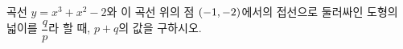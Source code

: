 곡선 $y=x^3+x^2-2$와 이 곡선 위의 점 $(-1{,}\mkern3mu\mathopen{}-2)$에서의 접선으로 둘러싸인 도형의 넓이를 $\dfrac{q}{p}$라 할 때, $p+q$의 값을 구하시오. 
